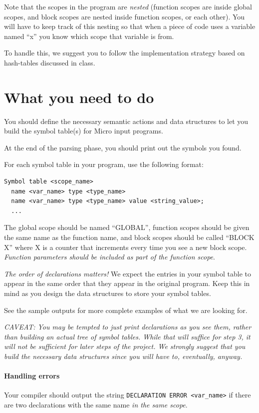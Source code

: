 \documentclass{article}
\begin{document}
Note that the scopes in the program are {\em nested} (function scopes are inside global scopes, and block scopes are nested inside function scopes, or each other). You will have to keep track of this nesting so that when a piece of code uses a variable named ``x'' you know which scope that variable is from.

To handle this, we suggest you to follow the implementation strategy based on hash-tables discussed in class.

\section{What you need to do}
You should define the necessary semantic actions and data structures to let you build the symbol table(s) for Micro input programs.

At the end of the parsing phase, you should print out the symbols you found.

For each symbol table in your program, use the following format:
\begin{lstlisting}[numbers=none]
  Symbol table <scope_name>
  name <var_name> type <type_name>
  name <var_name> type <type_name> value <string_value>;
  ...
\end{lstlisting}

The global scope should be named ``GLOBAL'', function scopes should be given the same name as the function name, and block scopes should be called ``BLOCK X'' where X is a counter that increments every time you see a new block scope. 
{\em Function parameters should be included as part of the function scope}.

{\em The order of declarations matters!} We expect the entries in your symbol table to appear in the same order that they appear in the original program. Keep this in mind as you design the data structures to store your symbol tables.

See the sample outputs for more complete examples of what we are looking for.

{\em CAVEAT: You may be tempted to just print declarations as you see them, rather than building an actual tree of symbol tables. While that will suffice for step 3, it will not be sufficient for later steps of the project. We strongly suggest that you build the necessary data structures since you will have to, eventually, anyway.}

\paragraph{Handling errors}
Your compiler should output the string \texttt{DECLARATION ERROR <var\_name>} if there are two declarations with the same name {\em in the same scope}.
\end{document}
